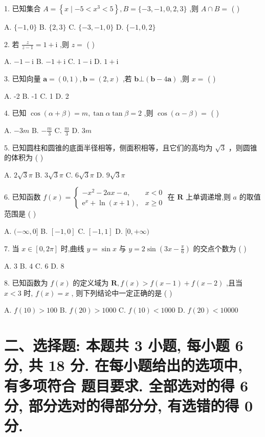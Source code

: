 \documentclass[10pt]{article}
\begin{document}
1. 已知集合 \(A = \left\{  {x \mid   - 5 < {x}^{3} < 5}\right\}  ,B = \{  - 3, - 1,0,2,3\}\) ,则 \(A \cap  B =\) ( )

A. \(\{  - 1,0\}\) B. \(\{ 2,3\}\) C. \(\{  - 3, - 1,0\}\) D. \(\{  - 1,0,2\}\)

2. 若 \(\frac{z}{z - 1} = 1 + \mathrm{i}\) ,则 \(z =\) ( )

A. \(- 1 - \mathrm{i}\) B. \(- 1 + \mathrm{i}\) C. \(1 - \mathrm{i}\) D. \(1 + \mathrm{i}\)

3. 已知向量 \(\mathbf{a} = \left( {0,1}\right) ,\mathbf{b} = \left( {2,x}\right)\) ,若 \(\mathbf{b} \bot  \left( {\mathbf{b} - 4\mathbf{a}}\right)\) ,则 \(x =\) ( )

A. -2 B. -1 C. 1 D. 2

4. 已知 \(\cos \left( {\alpha  + \beta }\right)  = m,\tan \alpha \tan \beta  = 2\) ,则 \(\cos \left( {\alpha  - \beta }\right)  =\) ( )

A. \(- {3m}\) B. \(- \frac{m}{3}\) C. \(\frac{m}{3}\) D. \({3m}\)

5. 已知圆柱和圆锥的底面半径相等，侧面积相等，且它们的高均为 \(\sqrt{3}\) ，则圆锥的体积为 ( )

A. \(2\sqrt{3}\pi\) B. \(3\sqrt{3}\pi\) C. \(6\sqrt{3}\pi\) D. \(9\sqrt{3}\pi\)

6. 已知函数 \(f\left( x\right)  = \left\{  \begin{matrix}  - {x}^{2} - {2ax} - a, & x < 0 \\  {\mathrm{e}}^{x} + \ln \left( {x + 1}\right) , & x \geq  0 \end{matrix}\right.\) 在 \(\mathbf{R}\) 上单调递增,则 \(a\) 的取值范围是 ( )

A. \(( - \infty ,0\rbrack\) B. \(\left\lbrack  {-1,0}\right\rbrack\) C. \(\left\lbrack  {-1,1}\right\rbrack\) D. \(\lbrack 0, + \infty )\)

7. 当 \(x \in  \left\lbrack  {0,{2\pi }}\right\rbrack\) 时,曲线 \(y = \sin x\) 与 \(y = 2\sin \left( {{3x} - \frac{\pi }{6}}\right)\) 的交点个数为 ( )

A. 3 B. 4 C. 6 D. 8

8. 已知函数为 \(f\left( x\right)\) 的定义域为 \(\mathbf{R},f\left( x\right)  > f\left( {x - 1}\right)  + f\left( {x - 2}\right)\) ,且当 \(x < 3\) 时, \(f\left( x\right)  = x\) , 则下列结论中一定正确的是 ( )

A. \(f\left( {10}\right)  > {100}\) B. \(f\left( {20}\right)  > {1000}\) C. \(f\left( {10}\right)  < {1000}\) D. \(f\left( {20}\right)  < {10000}\)

\section*{二、选择题: 本题共 3 小题, 每小题 6 分, 共 18 分. 在每小题给出的选项中, 有多项符合 题目要求. 全部选对的得 6 分, 部分选对的得部分分, 有选错的得 0 分.}
\end{document}
